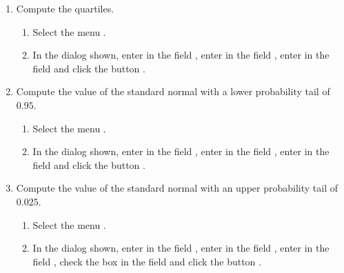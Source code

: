 \begin{enumerate}[leftmargin=*]
\begin{enumerate}
\item Compute the quartiles.
\begin{indication}
\begin{enumerate}
\item Select the menu .
\item In the dialog shown, enter  in the field , enter  in the field , enter  in the field  and click the button .
\end{enumerate}
\end{indication}

\item Compute the value of the standard normal with a lower probability tail of $0.95$.
\begin{indication}
\begin{enumerate}
\item Select the menu .
\item In the dialog shown, enter  in the field , enter  in the field , enter  in the field  and click the button .
\end{enumerate}
\end{indication}

\item Compute the value of the standard normal with an upper probability tail of $0.025$.
\begin{indication}
\begin{enumerate}
\item Select the menu .
\item In the dialog shown, enter  in the field , enter  in the field , enter  in the field , check the box  in the field  and click the button .
\end{enumerate}
\end{indication}
\end{enumerate}



\end{enumerate}
